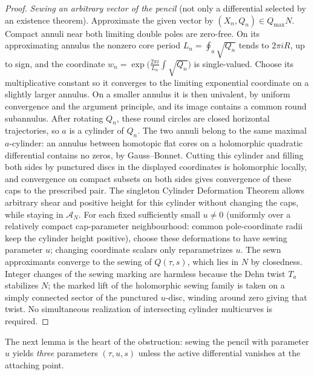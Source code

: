 \documentclass[11pt]{article}
\theoremstyle{remark}
\begin{document}
\begin{proof}
\emph{Sewing an arbitrary vector of the pencil} (not only a
differential selected by an existence theorem).
Approximate the given vector by \((X_n,Q_n)\in Q_{\max}N\). Compact annuli near
both limiting double poles are zero-free. On its approximating
annulus the nonzero core period \(L_n=\oint_a\sqrt{Q_n}\) tends
to \(2\pi iR\), up to sign, and the coordinate
\(w_n=\exp\bigl(\frac{2\pi i}{L_n}\int\sqrt{Q_n}\bigr)\)
is single-valued. Choose its multiplicative constant so it converges
to the limiting exponential coordinate on a slightly larger
annulus. On a smaller annulus it is then univalent, by
uniform convergence and the argument principle, and its
image contains a common round subannulus. After rotating
\(Q_n\), these round circles are closed horizontal
trajectories, so \(a\) is a cylinder of \(Q_n\).
The two annuli belong to the same maximal \(a\)-cylinder:
an annulus between homotopic flat cores on a holomorphic
quadratic differential contains no zeros, by Gauss--Bonnet.
Cutting this cylinder and filling both sides by punctured
discs in the displayed coordinates is holomorphic locally, and
convergence on compact subsets on both sides gives convergence
of these caps to the prescribed pair. The singleton
Cylinder Deformation Theorem \cite[Theorem 5.1]{WrightCylinder}
allows arbitrary shear and positive height for this cylinder
without changing the caps, while staying in \(\mathcal A_N\).
For each fixed sufficiently small \(u\ne0\) (uniformly over a
relatively compact cap-parameter neighbourhood: common
pole-coordinate radii keep the cylinder height positive), choose
these deformations to have sewing parameter \(u\); changing
coordinate scalars only reparametrizes \(u\). The sewn approximants
converge to the sewing of \(Q(\tau,s)\), which lies in \(N\) by
closedness. Integer changes of the sewing marking are harmless
because the Dehn twist \(T_a\) stabilizes \(N\); the marked lift of
the holomorphic sewing family is taken on a simply connected sector
of the punctured \(u\)-disc, winding around zero giving that twist.
No simultaneous realization of intersecting cylinder multicurves is
required.
\end{proof}

The next lemma is the heart of the obstruction: sewing the pencil
with parameter \(u\) yields \emph{three} parameters \((\tau,u,s)\)
unless the active differential vanishes at the attaching point.
\end{document}
